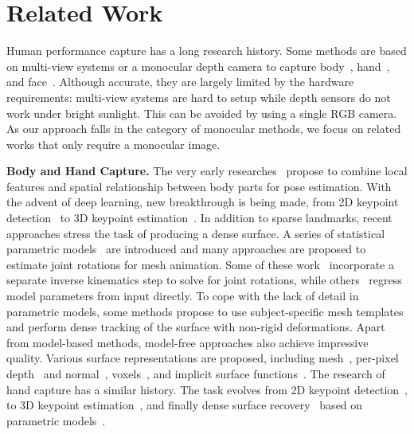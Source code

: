 \documentclass[final]{cvpr}
\begin{document}
 \section{Related Work}
Human performance capture has a long research history.
Some methods are based on multi-view systems or a monocular depth camera to capture body~\cite{zhang20204d,joo2017panoptic}, hand~\cite{yuan2018depth,mueller2017real}, and face~\cite{ghosh2011multiview,roth2016adaptive}.
Although accurate, they are largely limited by the hardware requirements: multi-view systems are hard to setup while depth sensors do not work under bright sunlight.
This can be avoided by using a single RGB camera.
As our approach falls in the category of monocular methods, we focus on related works that only require a monocular image.
\par
\noindent \textbf{Body and Hand Capture.}
The very early researches~\cite{sigal2006measure,dantone2013human} propose to combine local features and spatial relationship between body parts for pose estimation.
With the advent of deep learning, new breakthrough is being made, from 2D keypoint detection~\cite{cao2018openpose, fang2017rmpe} to 3D keypoint estimation~\cite{tekin2016structured,habibie2019wild,mehta2017monocular,Artacho_2020_CVPR}.
In addition to sparse landmarks, recent approaches stress the task of producing a dense surface.
A series of statistical parametric models~\cite{anguelov2005scape,loper2015smpl,pavlakos2019expressive,joo2018total} are introduced and many approaches are proposed to estimate joint rotations for mesh animation.
Some of these work~\cite{mehta2017vnect,shimada2020physcap,xiang2019monocular} incorporate a separate inverse kinematics step to solve for joint rotations, while others~\cite{kanazawa2018end,kolotouros2019learning,habermann2020deepcap} regress model parameters from input directly.
To cope with the lack of detail in parametric models, some methods \cite{xu2018monoperfcap,habermann2019livecap,habermann2020deepcap} propose to use subject-specific mesh templates and perform dense tracking of the surface with non-rigid deformations.
Apart from model-based methods, model-free approaches also achieve impressive quality.
Various surface representations are proposed, including mesh~\cite{kolotouros2019convolutional}, per-pixel depth~\cite{gabeur2019moulding} and normal~\cite{smith2019facsimile}, voxels~\cite{zheng2019deephuman,jackson20183d}, and implicit surface functions~\cite{saito2019pifu,saito2020pifuhd}.
The research of hand capture has a similar history.
The task evolves from 2D keypoint detection~\cite{simon2017hand,wang2018mask}, to 3D keypoint estimation~\cite{zimmermann2017learning,mueller2018ganerated,doosti2020hope}, and finally dense surface recovery~\cite{boukhayma20193d,zhou2020monocular,zhang2019end,zhang2019interactionfusion} based on parametric models~\cite{romero2017embodied,tkach2016sphere}.
\end{document}
